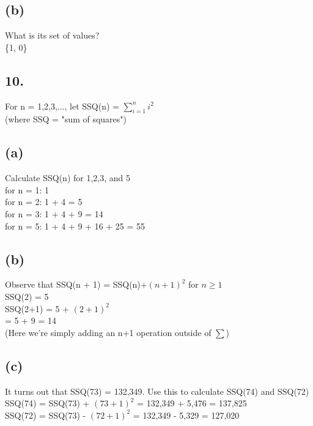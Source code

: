 \documentclass[11pt]{article}
\begin{document}
\subsection*{(b)}
\begin{center}
What is its set of values?\\
\hfill \break
\{1, 0\}
\end{center}
%
%
\subsection*{10.}
\begin{center}
For n = 1,2,3,..., let SSQ(n) = $\sum_{i=1}^{n} i^{2}$\\
(where SSQ = "sum of squares")
\end{center}

\subsection*{(a)}
\begin{center}
Calculate SSQ(n) for 1,2,3, and 5\\
\hfill \break
for n = 1: 1\\
for n = 2: 1 + 4 = 5\\
for n = 3: 1 + 4 + 9 = 14\\
for n = 5: 1 + 4 + 9 + 16 + 25 = 55\\
\end{center}

\subsection*{(b)}
\begin{center}
Observe that SSQ(n + 1) = SSQ(n)+$(n+1)^{2}$ for $n \geq 1$\\
\hfill \break
SSQ(2) = 5\\
SSQ(2+1) = 5 + $(2+1)^{2}$\\
= 5 + 9 = 14\\
(Here we're simply adding an n+1 operation outside of $\sum$)
\end{center}

\subsection*{(c)}
\begin{center}
It turns out that SSQ(73) = 132,349. Use this to calculate SSQ(74) and SSQ(72)\\
\hfill \break
SSQ(74) = SSQ(73) + $(73+1)^{2}$ = 132,349 + 5,476 = 137,825\\
SSQ(72) = SSQ(73) - $(72+1)^{2}$ = 132,349 - 5,329 = 127,020
\end{center}
%
%
\end{document}

